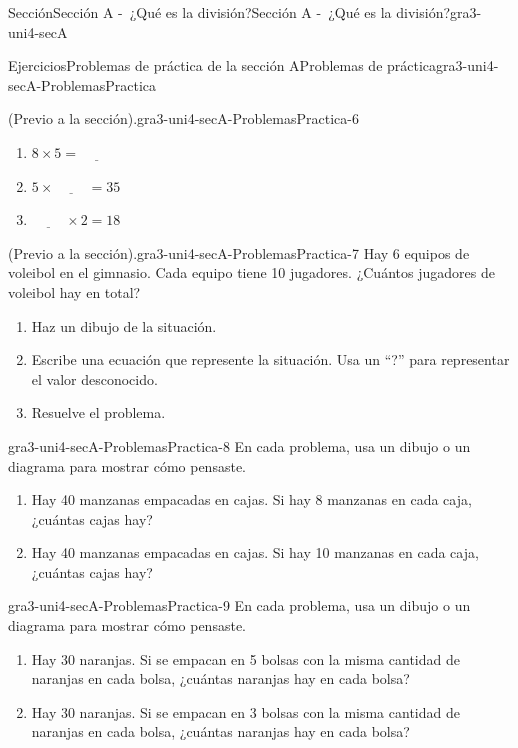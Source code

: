 \documentclass[twoside,10pt,]{article}
\begin{document}
\begin{sectionptx}{Sección}{Sección A -~¿Qué es la división?}{}{Sección A -~¿Qué es la división?}{}{}{gra3-uni4-secA}
\begin{exercises-subsection}{Ejercicios}{Problemas de práctica de la sección A}{}{Problemas de práctica}{}{}{gra3-uni4-secA-ProblemasPractica}
\begin{divisionexercise}{4}{(Previo a la sección).}{}{gra3-uni4-secA-ProblemasPractica-6}
\begin{enumerate}[label=(\alph*)]
\item{}\(\displaystyle 8 \times 5 = \underline{\hspace{1cm}}\)%
\item{}\(\displaystyle 5 \times \underline{\hspace{1cm}} = 35\)%
\item{}\(\displaystyle \underline{\hspace{1cm}} \times 2 = 18\)%
\end{enumerate}
%
\end{divisionexercise}%
\begin{divisionexercise}{5}{(Previo a la sección).}{}{gra3-uni4-secA-ProblemasPractica-7}%
Hay 6 equipos de voleibol en el gimnasio. Cada equipo tiene 10 jugadores. ¿Cuántos jugadores de voleibol hay en total?%
\par
%
\begin{enumerate}[label=(\alph*)]
\item{}Haz un dibujo de la situación.%
\item{}Escribe una ecuación que represente la situación. Usa un “?” para representar el valor desconocido.%
\item{}Resuelve el problema.%
\end{enumerate}
%
\end{divisionexercise}%
\begin{divisionexercise}{6}{}{}{gra3-uni4-secA-ProblemasPractica-8}%
En cada problema, usa un dibujo o un diagrama para mostrar cómo pensaste.%
\par
%
\begin{enumerate}[label=(\alph*)]
\item{}Hay 40 manzanas empacadas en cajas. Si hay 8 manzanas en cada caja, ¿cuántas cajas hay?%
\item{}Hay 40 manzanas empacadas en cajas. Si hay 10 manzanas en cada caja, ¿cuántas cajas hay?%
\end{enumerate}
%
\end{divisionexercise}%
\begin{divisionexercise}{7}{}{}{gra3-uni4-secA-ProblemasPractica-9}%
En cada problema, usa un dibujo o un diagrama para mostrar cómo pensaste.%
%
\begin{enumerate}[label=(\alph*)]
\item{}Hay 30 naranjas. Si se empacan en 5 bolsas con la misma cantidad de naranjas en cada bolsa, ¿cuántas naranjas hay en cada bolsa?%
\item{}Hay 30 naranjas. Si se empacan en 3 bolsas con la misma cantidad de naranjas en cada bolsa, ¿cuántas naranjas hay en cada bolsa?%

\end{enumerate}
\end{divisionexercise}
\end{exercises-subsection}
\end{sectionptx}
\end{document}
